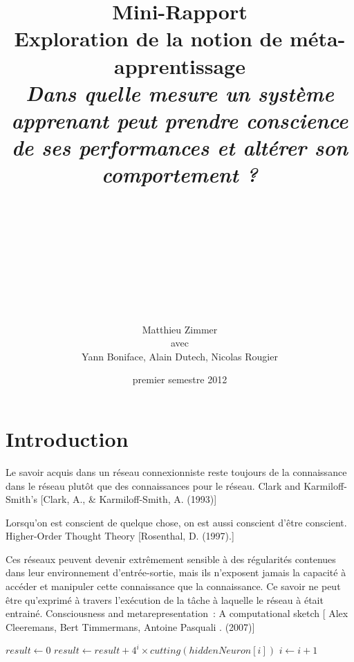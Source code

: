 \documentclass[a4paper,12pt, twoside]{report}
\title{
  \textbf{Mini-Rapport}
  \\[1cm]
  Exploration de la notion de méta-apprentissage
  \\[1.3cm]
  \textit{
  Dans quelle mesure un système apprenant peut prendre conscience de ses performances
  et altérer son comportement ?}
}
\author{
  \\
  \\
  \\
  \\
  \\
  \\
  \\
  \\
  \\
  Matthieu Zimmer \\
  avec \\
  Yann Boniface, Alain Dutech, Nicolas Rougier }
\date{premier semestre 2012}
\begin{document}
\maketitle





\chapter{Introduction}

Le savoir acquis dans un réseau connexionniste reste toujours 
de la connaissance dans le réseau plutôt que des connaissances 
pour le réseau. 
\newline
Clark and Karmiloff-Smith's [Clark, A., \& Karmiloff-Smith, A. (1993)]

Lorsqu'on est conscient de quelque chose, on est aussi conscient d'être conscient.
\newline
Higher-Order Thought Theory [Rosenthal, D. (1997).]

Ces réseaux peuvent devenir extrêmement sensible à des régularités contenues dans 
leur environnement d'entrée-sortie, mais ils n'exposent jamais la capacité à 
accéder et manipuler cette connaissance que la connaissance. Ce savoir ne peut
être qu'exprimé à travers l'exécution de la tâche à laquelle le réseau à était entrainé.
\newline
Consciousness and metarepresentation : A computational sketch
[ Alex Cleeremans, Bert Timmermans, Antoine Pasquali . (2007)]

\begin{algorithmic}

\State $result \gets 0$
\State $result \gets result + 4^{i} \times cutting(hiddenNeuron[i]) $
\State $i \gets i + 1$
\EndFor
\end{algorithmic}
\end{document}
